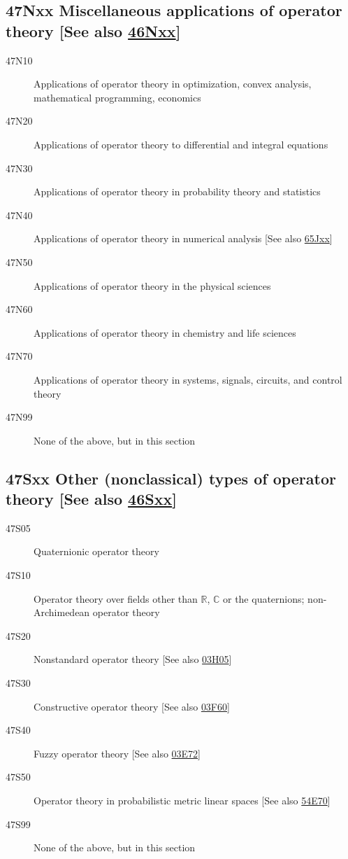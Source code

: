 \documentclass[letterpaper]{article}
\begin{document}
\subsection*{47Nxx  Miscellaneous applications of operator theory [See also \hyperref[46Nxx]{46Nxx}] }\label{47Nxx}
\begin{description}  
\item [47N10]\label{47N10} Applications of operator theory in optimization, convex analysis, mathematical programming, economics
\item [47N20]\label{47N20} Applications of operator theory to differential and integral equations
\item [47N30]\label{47N30} Applications of operator theory in probability theory and statistics
\item [47N40]\label{47N40} Applications of operator theory in numerical analysis [See also \hyperref[65Jxx]{65Jxx}]
\item [47N50]\label{47N50} Applications of operator theory in the physical sciences
\item [47N60]\label{47N60} Applications of operator theory in chemistry and life sciences
\item [47N70]\label{47N70} Applications of operator theory in systems, signals, circuits, and control theory
\item [47N99]\label{47N99} None of the above, but in this section
\end{description}
\subsection*{47Sxx  Other (nonclassical) types of operator theory [See also \hyperref[46Sxx]{46Sxx}] }\label{47Sxx}
\begin{description}  
\item [47S05]\label{47S05} Quaternionic operator theory
\item [47S10]\label{47S10} Operator theory over fields other than $\mathbb{R}$, $\mathbb{C}$ or the quaternions; non-Archimedean operator theory
\item [47S20]\label{47S20} Nonstandard operator theory [See also \hyperref[03H05]{03H05}]
\item [47S30]\label{47S30} Constructive operator theory [See also \hyperref[03F60]{03F60}]
\item [47S40]\label{47S40} Fuzzy operator theory [See also \hyperref[03E72]{03E72}]
\item [47S50]\label{47S50} Operator theory in probabilistic metric linear spaces [See also \hyperref[54E70]{54E70}]
\item [47S99]\label{47S99} None of the above, but in this section
\end{description}
\end{document}
